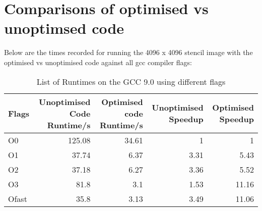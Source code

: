 \documentclass{article}
\begin{document}
    \section{Comparisons of optimised vs unoptimsed code}
    Below are the times recorded for running the 4096 x 4096 stencil image with the optimised vs unoptimised code against all gcc compiler flags:
        \begin{table}[htbp]
        \centering
        \caption{List of Runtimes on the GCC 9.0 using different flags}
        \begin{tabular}{|l|r|r|r|r|}
        \hline
        Flags & Unoptimised Code Runtime/s & Optimised code Runtime/s & Unoptimised Speedup & Optimised Speedup \\
        \hline
        O0    & 125.08 & 34.61 & 1     & 1 \\
        \hline
        O1    & 37.74 & 6.37  & 3.31  & 5.43 \\
        \hline
        O2    & 37.18 & 6.27  & 3.36  & 5.52 \\
        \hline
        O3    & 81.8  & 3.1   & 1.53  & 11.16 \\
        \hline
        Ofast & 35.8  & 3.13  & 3.49  & 11.06 \\
        \hline
        \end{tabular}%
        \label{tab:addlabel}%
        \end{table}%

\end{document}
